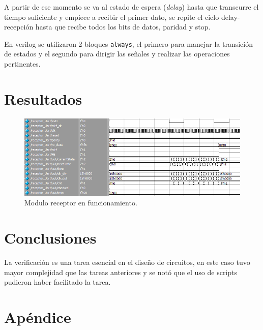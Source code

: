 \documentclass[11pt]{article}
\begin{document}
A partir de ese momento se va al estado de espera (\emph{delay}) hasta
que transcurre el tiempo suficiente y empiece a recibir el primer
dato, se repite el ciclo delay-recepción hasta que recibe todos los
bits de datos, paridad y stop.

En verilog se utilizaron 2 bloques \texttt{always}, el primero para manejar
la transición de estados y el segundo para dirigir las señales y
realizar las operaciones pertinentes.
\section{Resultados}
\label{sec:orgheadline4}
\begin{figure}[htb]
\centering
\includegraphics[width=.9\linewidth]{data/77/64c860-a96e-4031-b810-d94c6a7782e1/screenshot-20160222-160429.png}
\caption{Modulo receptor en funcionamiento.}
\end{figure}
\section{Conclusiones}
\label{sec:orgheadline5}
La verificación es una tarea esencial en el diseño de circuitos, en
este caso tuvo mayor complejidad que las tareas anteriores y se notó
que el uso de scripts pudieron haber facilitado la tarea.
\section{Apéndice}
\label{sec:orgheadline7}
\end{document}
